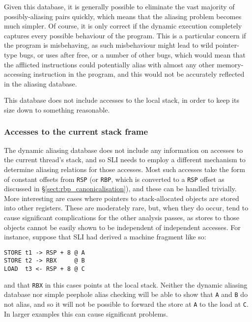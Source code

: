 \documentclass[12pt,a4paper]{book}
\begin{document}


Given this database, it is generally possible to eliminate the vast majority of possibly-aliasing pairs quickly, which means that the aliasing problem becomes much simpler.
Of course, it is only correct if the dynamic execution completely captures every possible behaviour of the program.
This is a particular concern if the program is misbehaving, as such misbehaviour might lead to wild pointer-type bugs, or uses after free, or a number of other bugs, which would mean that the afflicted instructions could potentially alias with almost any other memory-accessing instruction in the program, and this would not be accurately reflected in the aliasing database.


This database does not include accesses to the local stack, in order to keep its size down to something reasonable.

\subsubsection{Accesses to the current stack frame}

The dynamic aliasing database does not include any information on accesses to the current thread's stack, and so SLI needs to employ a different mechanism to determine aliasing relations for those accesses.
Most such accesses take the form of constant offsets from \verb|RSP| (or \verb|RBP|, which is converted to a \verb|RSP| offset as discussed in \S\ref{sect:rbp_canonicalisation}), and these can be handled trivially.
More interesting are cases where pointers to stack-allocated objects are stored into other registers.
These are moderately rare, but, when they do occur, tend to cause significant complications for the other analysis passes, as stores to those objects cannot be easily shown to be independent of independent accesses.
For instance, suppose that SLI had derived a machine fragment like so:

\begin{verbatim}
STORE t1 -> RSP + 8 @ A
STORE t2 -> RBX     @ B
LOAD  t3 <- RSP + 8 @ C
\end{verbatim}

and that \verb|RBX| in this cases points at the local stack.
Neither the dynamic aliasing database nor simple peephole alias checking will be able to show that \verb|A| and \verb|B| do not alias, and so it will not be possible to forward the store at \verb|A| to the load at \verb|C|.
In larger examples this can cause significant problems.
\end{document}
